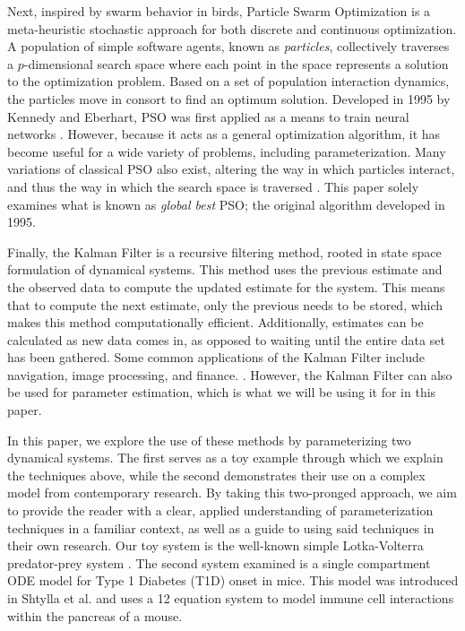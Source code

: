 \documentclass{article}
\begin{document}
\par Next, inspired by swarm behavior in birds, Particle Swarm Optimization is a meta-heuristic stochastic approach for both discrete and continuous optimization. A population of simple software agents, known as \emph{particles}, collectively traverses a $p$-dimensional search space where each point in the space represents a solution to the optimization problem. Based on a set of population interaction dynamics, the particles move in consort to find an optimum solution. Developed in 1995 by Kennedy and Eberhart, PSO was first applied as a means to train neural networks \cite{PSOorig}. However, because it acts as a general optimization algorithm, it has become useful for a wide variety of problems, including parameterization. Many variations of classical PSO also exist, altering the way in which particles interact, and thus the way in which the search space is traversed \cite{PSOthesis}. This paper solely examines what is known as \emph{global best} PSO; the original algorithm developed in 1995. 
\par Finally, the Kalman Filter is a recursive filtering method, rooted in state space formulation of dynamical systems. \cite{SimonHaykin} This method uses the previous estimate and the observed data to compute the updated estimate for the system. This means that to compute the next estimate, only the previous needs to be stored, which makes this method computationally efficient. Additionally, estimates can be calculated as new data comes in, as opposed to waiting until the entire data set has been gathered. Some common applications of the Kalman Filter include navigation, image processing, and finance. \cite{TamThesis}. However, the Kalman Filter can also be used for parameter estimation, which is what we will be using it for in this paper. 
\par In this paper, we explore the use of these methods by parameterizing two dynamical systems. The first serves as a toy example through which we explain the techniques above, while the second demonstrates their use on a complex model from contemporary research. By taking this two-pronged approach, we aim to provide the reader with a clear, applied understanding of parameterization techniques in a familiar context, as well as a guide to using said techniques in their own research. Our toy system is the well-known simple Lotka-Volterra predator-prey system \cite{Lotka} \cite{Volterra}. The second system examined is a single compartment ODE model for Type 1 Diabetes (T1D) onset in mice. This model was introduced in Shtylla et al. \cite{shtylla2019mathematical} and uses a 12 equation system to model immune cell interactions within the pancreas of a mouse.
\end{document}
